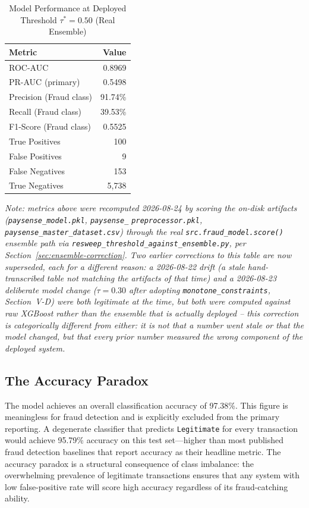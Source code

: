\documentclass[conference]{IEEEtran}
\begin{document}
\begin{table}[H]
\centering
\caption{Model Performance at Deployed Threshold $\tau^* = 0.50$ (Real Ensemble)}
\label{tab:results}
\begin{tabular}{@{}lr@{}}
\toprule
Metric & Value \\
\midrule
ROC-AUC                  & 0.8969 \\
PR-AUC (primary)         & 0.5498 \\
Precision (Fraud class)  & 91.74\% \\
Recall (Fraud class)     & 39.53\% \\
F1-Score (Fraud class)   & 0.5525 \\
True Positives           & 100 \\
False Positives          & 9 \\
False Negatives          & 153 \\
True Negatives           & 5{,}738 \\
\bottomrule
\end{tabular}
\end{table}

\textit{Note: metrics above were recomputed 2026-08-24 by scoring the
on-disk artifacts (\texttt{paysense\_model.pkl}, \texttt{paysense\_}
\texttt{preprocessor.pkl}, \texttt{paysense\_master\_dataset.csv}) through
the real \texttt{src.fraud\_model.score()} ensemble path via
\texttt{resweep\_threshold\_against\_ensemble.py}, per
Section~\ref{sec:ensemble-correction}. Two earlier corrections to this
table are now superseded, each for a different reason: a 2026-08-22 drift
(a stale hand-transcribed table not matching the artifacts of that time)
and a 2026-08-23 deliberate model change ($\tau=0.30$ after adopting
\texttt{monotone\_constraints}, Section~V-D) were both legitimate at the
time, but both were computed against raw XGBoost rather than the ensemble
that is actually deployed -- this correction is categorically different
from either: it is not that a number went stale or that the model
changed, but that every prior number measured the wrong component of the
deployed system.}

\subsection{The Accuracy Paradox}

The model achieves an overall classification accuracy of 97.38\%. This
figure is meaningless for fraud detection and is explicitly excluded from
the primary reporting. A degenerate classifier that predicts
\texttt{Legitimate} for every transaction would achieve 95.79\% accuracy
on this test set---higher than most published fraud detection baselines
that report accuracy as their headline metric. The accuracy paradox is a
structural consequence of class imbalance: the overwhelming prevalence of
legitimate transactions ensures that any system with low false-positive
rate will score high accuracy regardless of its fraud-catching ability.
\end{document}
